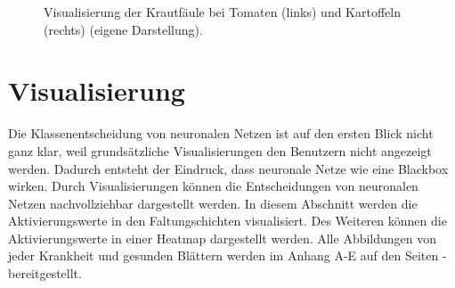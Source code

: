 \begin{figure}[h!]
	\hfill
	\hfill
	\hfill
	\caption{Visualisierung der Krautfäule bei Tomaten (links) und Kartoffeln (rechts) (eigene Darstellung).
	}
	\label{eval_pot_late}
\end{figure}















\newpage
\section{Visualisierung}

Die Klassenentscheidung von neuronalen Netzen ist auf den ersten Blick nicht ganz klar, weil grundsätzliche Visualisierungen den Benutzern nicht angezeigt werden. Dadurch entsteht der Eindruck, dass neuronale Netze wie eine Blackbox wirken. Durch Visualisierungen können die Entscheidungen von neuronalen Netzen nachvollziehbar dargestellt werden. In diesem Abschnitt werden die Aktivierungswerte in den Faltungschichten visualisiert. Des Weiteren können die Aktivierungswerte in einer Heatmap dargestellt werden. Alle Abbildungen von jeder Krankheit und gesunden Blättern werden im Anhang A-E auf den Seiten \pageref{anahnga} - \pageref{anahngd} bereitgestellt.


